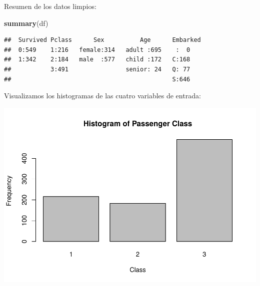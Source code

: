 \documentclass[]{article}
\newenvironment{Shaded}{\begin{snugshade}}{\end{snugshade}}
\newcommand{\KeywordTok}[1]{\textcolor[rgb]{0.13,0.29,0.53}{\textbf{#1}}}
\newcommand{\DataTypeTok}[1]{\textcolor[rgb]{0.13,0.29,0.53}{#1}}
\newcommand{\StringTok}[1]{\textcolor[rgb]{0.31,0.60,0.02}{#1}}
\newcommand{\OperatorTok}[1]{\textcolor[rgb]{0.81,0.36,0.00}{\textbf{#1}}}
\newcommand{\NormalTok}[1]{#1}
\begin{document}
Resumen de los datos limpios:

\begin{Shaded}
\begin{Highlighting}[]
\KeywordTok{summary}\NormalTok{(df)}
\end{Highlighting}
\end{Shaded}

\begin{verbatim}
##  Survived Pclass      Sex          Age      Embarked
##  0:549    1:216   female:314   adult :695    :  0   
##  1:342    2:184   male  :577   child :172   C:168   
##           3:491                senior: 24   Q: 77   
##                                             S:646
\end{verbatim}

Visualizamos los histogramas de las cuatro variables de entrada:

\begin{Shaded}
\end{Shaded}

\includegraphics{titanicDataClean_files/figure-latex/unnamed-chunk-11-1.pdf}

\begin{Shaded}
\end{Shaded}
\end{document}
